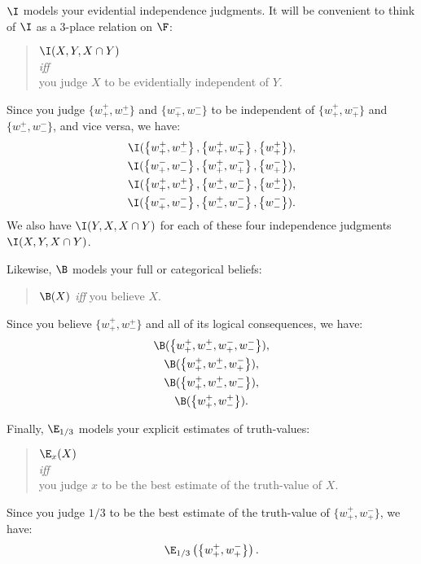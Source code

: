 $\I$ models your evidential independence judgments. It will be convenient to think of $\I$ as a $3$-place relation on $\F$:
\begin{quote}\centering
$\I(X,Y,X\cap Y)$\\
\textit{iff}\\
you judge $X$ to be evidentially independent of $Y$.
\end{quote}
Since you judge $\{w^+_+,w^+_-\}$ and $\{w^-_+,w^-_-\}$ to be independent of $\{w^+_+,w^-_+\}$ and $\{w^+_-,w^-_-\}$, and vice versa, we have:
$$
\begin{aligned}
	\I(\left\{w^+_+,w^+_-\right\},\left\{w^+_+,w^-_+\right\},\left\{w^+_+\right\}),\\
	\I(\left\{w^-_+,w^-_-\right\},\left\{w^+_+,w^-_+\right\},\left\{w^-_+\right\}),\\
	\I(\left\{w^+_+,w^+_-\right\},\left\{w^+_-,w^-_-\right\},\left\{w^+_-\right\}),\\
	\I(\left\{w^-_+,w^-_-\right\},\left\{w^+_-,w^-_-\right\},\left\{w^-_-\right\}).
\end{aligned}
$$
We also have $\I(Y,X,X\cap Y)$ for each of these four independence judgments $\I(X,Y,X\cap Y)$.

Likewise, $\B$ models your full or categorical beliefs:
\begin{quote}\centering
$\B(X)$ \hspace{.3em}\textit{iff}\hspace{.2em} you believe $X$.
\end{quote}
Since you believe $\{w^+_+,w^+_-\}$ and all of its logical consequences, we have:
\begin{gather*}
	\B(\left\{w^+_+,w^+_-,w^-_+,w^-_-\right\}),\\
	\B(\left\{w^+_+,w^+_-,w^-_+\right\}),\\
	\B(\left\{w^+_+,w^+_-,w^-_-\right\}),\\
	\B(\left\{w^+_+,w^+_-\right\}).
\end{gather*}

Finally, $\E_{1/3}$ models your explicit estimates of truth-values:
\begin{quote}
{\centering
$\E_{x}(X)$\\
\textit{iff}\\}
you judge $x$ to be the best estimate of the truth-value of $X$.
\end{quote}
Since you judge $1/3$ to be the best estimate of the truth-value of $\{w^+_+,w^-_+\}$, we have:
$$ \E_{1/3}\left(\left\{w^+_+,w^-_+\right\}\right). $$

